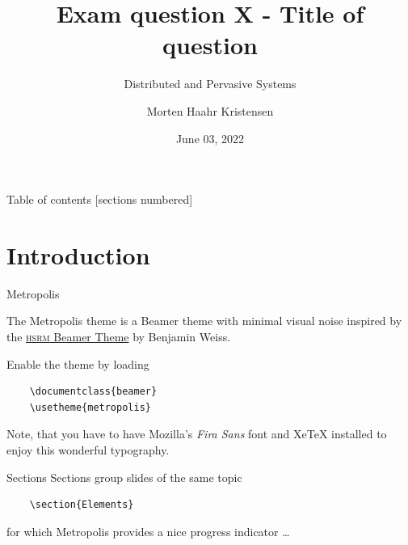 \documentclass[10pt]{beamer}
\title[Title of question]{Exam question X - Title of question}
\subtitle{Distributed and Pervasive Systems}
\date{June 03, 2022}
\author[M.H. Kristensen]{Morten Haahr Kristensen}
\institute{Department of Electrical and Computer Engineering - Aarhus University}
\begin{document}
\maketitle

\begin{frame}{Table of contents}
  [sections numbered]
  \tableofcontents[hideallsubsections]
\end{frame}

\section{Introduction}

\begin{frame}[fragile]{Metropolis}

  The Metropolis theme is a Beamer theme with minimal visual noise
  inspired by the \href{https://github.com/hsrmbeamertheme/hsrmbeamertheme}{\textsc{hsrm} Beamer
  Theme} by Benjamin Weiss.

  Enable the theme by loading

  \begin{verbatim}    \documentclass{beamer}
    \usetheme{metropolis}\end{verbatim}

  Note, that you have to have Mozilla's \emph{Fira Sans} font and XeTeX
  installed to enjoy this wonderful typography.
\end{frame}
\begin{frame}[fragile]{Sections}
  Sections group slides of the same topic

  \begin{verbatim}    \section{Elements}\end{verbatim}

  for which Metropolis provides a nice progress indicator \ldots
\end{frame}
\end{document}
